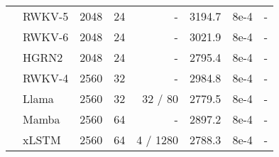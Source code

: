 \begin{tabular}{llrrrrrr}
    & RWKV-5 & 2048                 & 24               & -                       & 3194.7          & 8e-4    & -       \\                  
    & RWKV-6 & 2048                 & 24               & -                       & 3021.9          & 8e-4    & -       \\
    & HGRN2  & 2048                 & 24               & -                       & 2795.4          & 8e-4    & -       \\                      
    & RWKV-4 & 2560                 & 32               & -                       & 2984.8          & 8e-4    & -       \\
    & Llama  & 2560                 & 32               & 32 / 80                 & 2779.5          & 8e-4    & -       \\
    & Mamba  & 2560                 & 64               & -                       & 2897.2          & 8e-4    & -       \\
    & xLSTM  & 2560                 & 64               & 4 / 1280                & 2788.3          & 8e-4    & -       \\
    \bottomrule
\end{tabular}